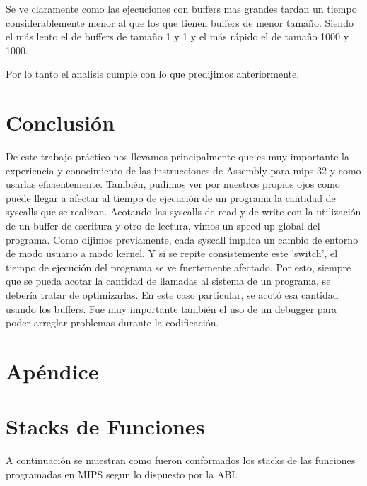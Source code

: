 \documentclass[11pt,a4paper]{article}
\begin{document}
Se ve claramente como las ejecuciones con buffers mas grandes tardan un tiempo considerablemente menor al que los que tienen buffers de menor tamaño. Siendo el más lento el de buffers de tamaño 1 y 1 y el más rápido el de tamaño 1000 y 1000.

Por lo tanto el analisis cumple con lo que predijimos anteriormente.

\section{Conclusión}
De este trabajo práctico nos llevamos principalmente que es muy importante la experiencia y conocimiento de las instrucciones de Assembly para mips 32 y como usarlas eficientemente. También, pudimos ver por nuestros propios ojos como puede llegar a afectar al tiempo de ejecución de un programa la cantidad de syscalls que se realizan. Acotando las syscalls de read y de write con la utilización de un buffer de escritura y otro de lectura, vimos un speed up global del programa.
Como dijimos previamente, cada syscall implica un cambio de entorno de modo usuario a modo kernel. Y si se repite consistemente este 'switch', el tiempo de ejecución del programa se ve fuertemente afectado. Por esto, siempre que se pueda acotar la cantidad de llamadas al sistema de un programa, se debería tratar de optimizarlas. En este caso particular, se acotó esa cantidad usando los buffers. 
Fue muy importante también el uso de un debugger para poder arreglar problemas durante la codificación.

\appendix

\section*{Apéndice}

\section{Stacks de Funciones}
A continuación se muestran como fueron conformados los stacks de las funciones programadas en MIPS segun lo dispuesto por la ABI.
\end{document}
